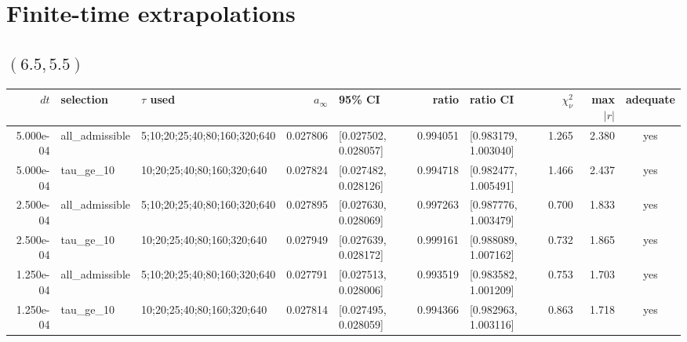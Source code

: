 \documentclass[10pt]{article}
\begin{document}
\section{Finite-time extrapolations}
\begin{landscape}
\scriptsize
\subsection*{$(6.5,5.5)$}
\begin{longtable}{r l l r l r l r r c}
\toprule
$dt$ & selection & $\tau$ used & $a_\infty$ & 95\% CI & ratio & ratio CI & $\chi^2_\nu$ & max $|r|$ & adequate\\
\midrule
\endfirsthead
5.000e-04 & all\_admissible & 5;10;20;25;40;80;160;320;640 & 0.027806 & [0.027502, 0.028057] & 0.994051 & [0.983179, 1.003040] & 1.265 & 2.380 & yes \\
5.000e-04 & tau\_ge\_10 & 10;20;25;40;80;160;320;640 & 0.027824 & [0.027482, 0.028126] & 0.994718 & [0.982477, 1.005491] & 1.466 & 2.437 & yes \\
2.500e-04 & all\_admissible & 5;10;20;25;40;80;160;320;640 & 0.027895 & [0.027630, 0.028069] & 0.997263 & [0.987776, 1.003479] & 0.700 & 1.833 & yes \\
2.500e-04 & tau\_ge\_10 & 10;20;25;40;80;160;320;640 & 0.027949 & [0.027639, 0.028172] & 0.999161 & [0.988089, 1.007162] & 0.732 & 1.865 & yes \\
1.250e-04 & all\_admissible & 5;10;20;25;40;80;160;320;640 & 0.027791 & [0.027513, 0.028006] & 0.993519 & [0.983582, 1.001209] & 0.753 & 1.703 & yes \\
1.250e-04 & tau\_ge\_10 & 10;20;25;40;80;160;320;640 & 0.027814 & [0.027495, 0.028059] & 0.994366 & [0.982963, 1.003116] & 0.863 & 1.718 & yes \\
\bottomrule
\end{longtable}

\end{landscape}
\end{document}
